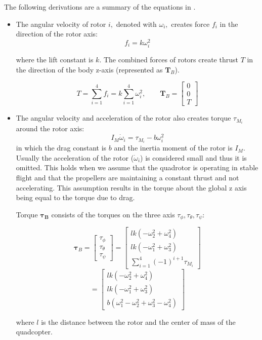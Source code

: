 The following derivations are a summary of the equations in \cite{aalto}.
\begin{itemize}
  \item The angular velocity of rotor $i,$ denoted with $\omega_{i},$ creates force $f_{i}$ in the direction of
the rotor axis: 
$$f_{i}=k \omega_{i}^{2}$$

where the lift constant is $k$.
The combined forces of rotors create thrust $T$ in the direction of the body z-axis (represented as $\boldsymbol{T}_{B}$).

$$T=\sum_{i=1}^{4} f_{i}=k \sum_{i=1}^{4} \omega_{i}^{2}, \quad \quad \boldsymbol{T}_{B}=\left[ \begin{array}{c}{0} \\ {0} \\ {T}\end{array}\right]$$

  \item The angular velocity and acceleration of the rotor also creates torque $\tau_{M_i}$ around the rotor axis: 
  $$I_{M} \dot{\omega}_{i} = \tau_{M_{i}} - b \omega_{i}^{2}$$
  in which the drag constant is $b$ and the inertia moment of the
rotor is $I_{M}$. 
Usually the acceleration of the rotor ($\dot{\omega}_{i}$) is considered small and thus it is omitted.
  This holds when we assume that the quadrotor is operating in stable flight and that the propellers are maintaining a constant thrust and not accelerating.
  This assumption results in the torque about the global z axis being equal to the torque due to drag.

Torque $\boldsymbol{\tau_B}$ consists of the torques on the three axis $\tau_\phi, \tau_\theta, \tau_\psi$:

$$
\boldsymbol{\tau}_{B}=\left[ \begin{array}{c}{\tau_{\phi}} \\ {\tau_{\theta}} \\ {\tau_{\psi}}\end{array}\right]=
\left[ \begin{array}{c}{l k\left(-\omega_{2}^{2}+\omega_{4}^{2}\right)} \\ {l k\left(-\omega_{1}^{2}+\omega_{3}^{2}\right)} \\ {\sum_{i=1}^{4} (-1)^{i+1} \tau_{M_{i}}}\end{array}\right]
  $$
  $$
  =
\left[ \begin{array}{c}
{l k\left(-\omega_{2}^{2}+\omega_{4}^{2}\right)} \\
{l k\left(-\omega_{1}^{2}+\omega_{3}^{2}\right)} \\
{b(\omega_{1}^{2}-\omega_{2}^{2}+\omega_{3}^{2}-\omega_{4}^{2})}\end{array}\right]
  $$

where $l$ is the distance between the rotor and the center of mass of the quadcopter.

\end{itemize}


